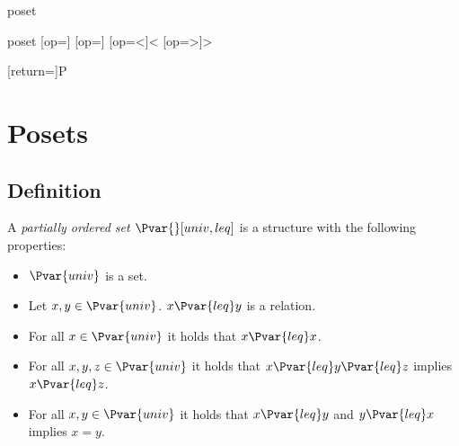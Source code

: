 \documentclass{stex}
\begin{document}
\begin{smodule}{poset}
  \STEXexport{
    \let\oldleq\leq
    \let\leq\relax
    \let\oldgeq\geq
    \let\geq\relax
  }

  \begin{mathstructure}{poset}
    [op=\oldleq]{\;\oldleq\;}
    [op=\oldgeq]{\;\oldgeq\;}
    [op=<]{\;<\;}
    [op=>]{\;>\;}
  \end{mathstructure}

  [return={\poset[comp=##1]}]{\mathcal P}

  \section{Posets}

  \begin{forthel}     
  \end{forthel}

  \subsection{Definition}
  
  \begin{forthel}
    \begin{signature*}
      A \emph{partially ordered set $\Pvar{}[univ,leq]$} is a structure with the following properties:

      \begin{itemize}
        \item \label{posetUnivSig}
          $\Pvar{univ}$ is a set.

        \item \label{posetLeqSig}
          Let $x, y \in \Pvar{univ}$. $x {\Pvar{leq}} y$ is a relation.

        \item \label{posetReflAx}
          For all $x \in \Pvar{univ}$ it holds that $x {\Pvar{leq}} x$.

        \item \label{posetTransAx}
          For all $x, y, z \in \Pvar{univ}$ it holds that $x {\Pvar{leq}} y {\Pvar{leq}} z$ implies $x {\Pvar{leq}} z$.

        \item \label{posetAntisymAx}
          For all $x, y \in \Pvar{univ}$ it holds that $x {\Pvar{leq}} y$ and $y {\Pvar{leq}} x$ implies $x=y$.
      \end{itemize}
    \end{signature*}


\end{forthel}
\end{smodule}
\end{document}
